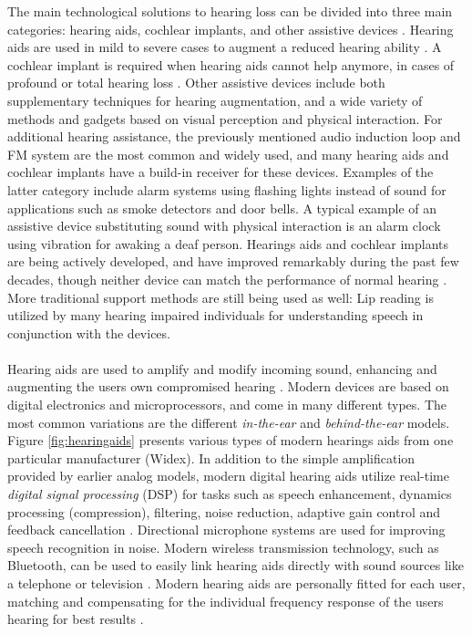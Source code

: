\documentclass[english, 12pt, a4paper, pdftex, elec, utf8]{aaltothesis}
\begin{document}
The main technological solutions to hearing loss can be divided into three main categories: hearing aids, cochlear implants, and other assistive devices \cite{moore2007cochlear}. Hearing aids are used in mild to severe cases to augment a reduced hearing ability \cite{moore2007cochlear, levitt2007historical}. A cochlear implant is required when hearing aids cannot help anymore, in cases of profound or total hearing loss \cite{moore2007cochlear, levitt2007historical}. Other assistive devices include both supplementary techniques for hearing augmentation, and a wide variety of methods and gadgets based on visual perception and physical interaction. For additional hearing assistance, the previously mentioned audio induction loop and FM system are the most common and widely used, and many hearing aids and cochlear implants have a build-in receiver for these devices. Examples of the latter category include alarm systems using flashing lights instead of sound for applications such as smoke detectors and door bells. A typical example of an assistive device substituting sound with physical interaction is an alarm clock using vibration for awaking a deaf person. Hearings aids and cochlear implants are being actively developed, and have improved remarkably during the past few decades, though neither device can match the performance of normal hearing \cite{moore2007cochlear, levitt2007historical, goehring2016speech}. More traditional support methods are still being used as well: Lip reading is utilized by many hearing impaired individuals for understanding speech in conjunction with the devices. \\\\
Hearing aids are used to amplify and modify incoming sound, enhancing and augmenting the users own compromised hearing \cite{levitt2007historical, salonen2013hearing, fink2008benefit}. Modern devices are based on digital electronics and microprocessors, and come in many different types. The most common variations are the different \textit{in-the-ear} and \textit{behind-the-ear} models. Figure \ref{fig:hearingaids} presents various types of modern hearings aids from one particular manufacturer (Widex). In addition to the simple amplification provided by earlier analog models, modern digital hearing aids utilize real-time \textit{digital signal processing} (DSP) for tasks such as speech enhancement, dynamics processing (compression), filtering, noise reduction, adaptive gain control and feedback cancellation \cite{moore2007cochlear, levitt2007historical, goehring2016speech}. Directional microphone systems are used for improving speech recognition in noise. Modern wireless transmission technology, such as Bluetooth, can be used to easily link hearing aids directly with sound sources like a telephone or television \cite{salonen2013hearing}. Modern hearing aids are personally fitted for each user, matching and compensating for the individual frequency response of the users hearing for best results \cite{moore2007cochlear}. \\
\end{document}
